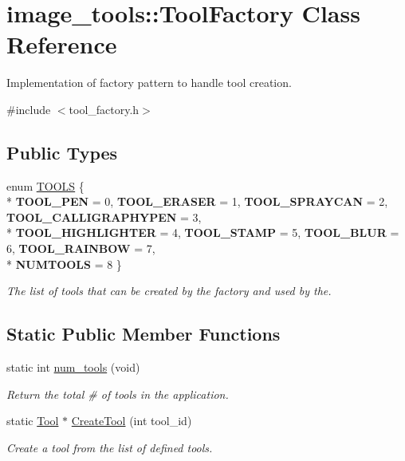 \hypertarget{classimage__tools_1_1ToolFactory}{}\section{image\+\_\+tools\+:\+:Tool\+Factory Class Reference}
\label{classimage__tools_1_1ToolFactory}


Implementation of factory pattern to handle tool creation.  




{\ttfamily \#include $<$tool\+\_\+factory.\+h$>$}

\subsection*{Public Types}
\begin{DoxyCompactItemize}
\item 
enum \hyperlink{classimage__tools_1_1ToolFactory_a75e9b7d0223f34953e6ea2c45612396f}{T\+O\+O\+LS} \{ \\*
{\bfseries T\+O\+O\+L\+\_\+\+P\+EN} = 0, 
{\bfseries T\+O\+O\+L\+\_\+\+E\+R\+A\+S\+ER} = 1, 
{\bfseries T\+O\+O\+L\+\_\+\+S\+P\+R\+A\+Y\+C\+AN} = 2, 
{\bfseries T\+O\+O\+L\+\_\+\+C\+A\+L\+L\+I\+G\+R\+A\+P\+H\+Y\+P\+EN} = 3, 
\\*
{\bfseries T\+O\+O\+L\+\_\+\+H\+I\+G\+H\+L\+I\+G\+H\+T\+ER} = 4, 
{\bfseries T\+O\+O\+L\+\_\+\+S\+T\+A\+MP} = 5, 
{\bfseries T\+O\+O\+L\+\_\+\+B\+L\+UR} = 6, 
{\bfseries T\+O\+O\+L\+\_\+\+R\+A\+I\+N\+B\+OW} = 7, 
\\*
{\bfseries N\+U\+M\+T\+O\+O\+LS} = 8
 \}\begin{DoxyCompactList}\small\item\em The list of tools that can be created by the factory and used by the. \end{DoxyCompactList}
\end{DoxyCompactItemize}
\subsection*{Static Public Member Functions}
\begin{DoxyCompactItemize}
\item 
static int \hyperlink{classimage__tools_1_1ToolFactory_a365cd7d26afa67a4d5b2e730f585df90}{num\+\_\+tools} (void)
\begin{DoxyCompactList}\small\item\em Return the total \# of tools in the application. \end{DoxyCompactList}\item 
static \hyperlink{classTool}{Tool} $\ast$ \hyperlink{classimage__tools_1_1ToolFactory_a2f5d6b0cc72bc3aff97e6eaba5182a00}{Create\+Tool} (int tool\+\_\+id)
\begin{DoxyCompactList}\small\item\em Create a tool from the list of defined tools. \end{DoxyCompactList}\end{DoxyCompactItemize}


